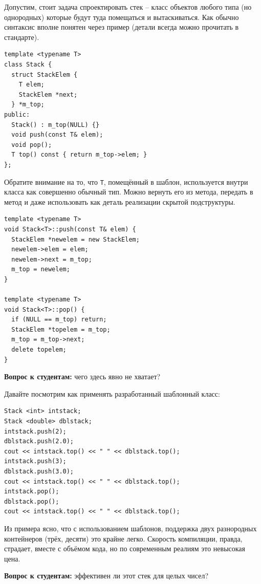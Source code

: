 \documentclass[a4paper,12pt,oneside]{book}
\newif\ifanswers
\begin{document}
Допустим, стоит задача спроектировать стек – класс объектов любого типа (но однородных) которые будут туда помещаться и вытаскиваться. Как обычно синтаксис вполне понятен через пример (детали всегда можно прочитать в стандарте).

\begin{lstlisting}
template <typename T>
class Stack {
  struct StackElem {
    T elem;
    StackElem *next;
  } *m_top;
public:
  Stack() : m_top(NULL) {}
  void push(const T& elem);
  void pop();
  T top() const { return m_top->elem; }
}; 
\end{lstlisting}

Обратите внимание на то, что \lstinline!T!, помещённый в шаблон, используется внутри класса как совершенно обычный тип. Можно вернуть его из метода, передать в метод и даже использовать как деталь реализации скрытой подструктуры.

\begin{lstlisting}
template <typename T>
void Stack<T>::push(const T& elem) {
  StackElem *newelem = new StackElem;
  newelem->elem = elem;
  newelem->next = m_top;
  m_top = newelem;
}

template <typename T>
void Stack<T>::pop() {
  if (NULL == m_top) return;
  StackElem *topelem = m_top;
  m_top = m_top->next;
  delete topelem;
}
\end{lstlisting}

\textbf{Вопрос к студентам:} чего здесь явно не хватает?

\ifanswers
Ожидается хоровой ответ: деструктор, копирование и перемещение
\fi

Давайте посмотрим как применять разработанный шаблонный класс:

\begin{lstlisting}
Stack <int> intstack;
Stack <double> dblstack;
intstack.push(2);
dblstack.push(2.0);
cout << intstack.top() << " " << dblstack.top();
intstack.push(3);
dblstack.push(3.0);
cout << intstack.top() << " " << dblstack.top();
intstack.pop();
dblstack.pop();
cout << intstack.top() << " " << dblstack.top();
\end{lstlisting}

Из примера ясно, что с использованием шаблонов, поддержка двух разнородных контейнеров (трёх, десяти) это крайне легко. Скорость компиляции, правда, страдает, вместе с объёмом кода, но по современным реалиям это невысокая цена.

\textbf{Вопрос к студентам:} эффективен ли этот стек для целых чисел?

\ifanswers
Вообще-то совсем не эффективен. Для целых чисел здесь хотелось бы, например, обычного массива, чтобы не тратиться на указатели.
\fi
\end{document}
